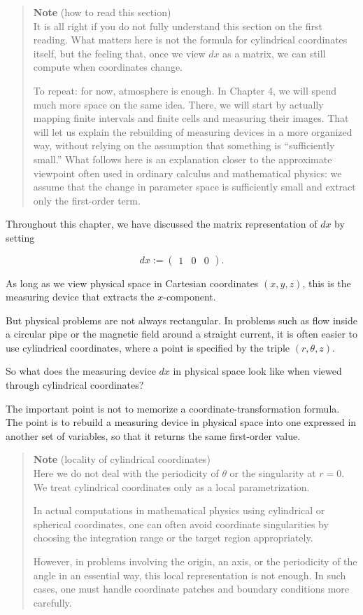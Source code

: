 \documentclass[a4paper,12pt,openany]{book}
\begin{document}
\begin{quote}
\textbf{Note} (how to read this section)\\
It is all right if you do not fully understand this section on the first
reading. What matters here is not the formula for cylindrical
coordinates itself, but the feeling that, once we view \(dx\) as a
matrix, we can still compute when coordinates change.

To repeat: for now, atmosphere is enough. In Chapter 4, we will spend
much more space on the same idea. There, we will start by actually
mapping finite intervals and finite cells and measuring their images.
That will let us explain the rebuilding of measuring devices in a more
organized way, without relying on the assumption that something is
``sufficiently small.'' What follows here is an explanation closer to
the approximate viewpoint often used in ordinary calculus and
mathematical physics: we assume that the change in parameter space is
sufficiently small and extract only the first-order term.
\end{quote}

Throughout this chapter, we have discussed the matrix representation of
\(dx\) by setting

\[
dx:=\begin{pmatrix}1&0&0\end{pmatrix}.
\]

As long as we view physical space in Cartesian coordinates \((x,y,z)\),
this is the measuring device that extracts the \(x\)-component.

But physical problems are not always rectangular. In problems such as
flow inside a circular pipe or the magnetic field around a straight
current, it is often easier to use cylindrical coordinates, where a
point is specified by the triple \((r,\theta,z)\).

So what does the measuring device \(dx\) in physical space look like
when viewed through cylindrical coordinates?

The important point is not to memorize a coordinate-transformation
formula. The point is to rebuild a measuring device in physical space
into one expressed in another set of variables, so that it returns the
same first-order value.

\begin{quote}
\textbf{Note} (locality of cylindrical coordinates)\\
Here we do not deal with the periodicity of \(\theta\) or the
singularity at \(r=0\). We treat cylindrical coordinates only as a local
parametrization.

In actual computations in mathematical physics using cylindrical or
spherical coordinates, one can often avoid coordinate singularities by
choosing the integration range or the target region appropriately.

However, in problems involving the origin, an axis, or the periodicity
of the angle in an essential way, this local representation is not
enough. In such cases, one must handle coordinate patches and boundary
conditions more carefully.
\end{quote}
\end{document}
